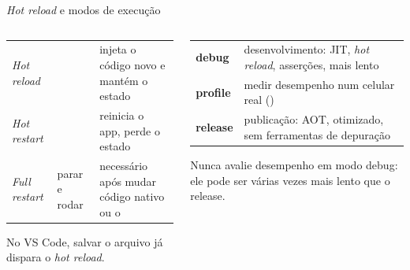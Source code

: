 \documentclass[aspectratio=169,10pt]{beamer}
\begin{document}
\begin{frame}{\emph{Hot reload} e modos de execução}
  \begin{columns}[T]
    \begin{column}{0.5\textwidth}
      \scriptsize
      \begin{tabularx}{\linewidth}{@{}l L L@{}}
        \toprule
         &  &  \\
        \midrule
        \emph{Hot reload} &  & injeta o código novo e mantém o estado \\
        \emph{Hot restart} &  & reinicia o app, perde o estado \\
        \emph{Full restart} & parar e rodar & necessário após mudar código nativo ou o  \\
        \bottomrule
      \end{tabularx}
      \begin{dica}
        No VS Code, salvar o arquivo já dispara o \emph{hot reload}.
      \end{dica}
    \end{column}
    \begin{column}{0.48\textwidth}
      \scriptsize
      \begin{tabularx}{\linewidth}{@{}l L@{}}
        \toprule
         &  \\
        \midrule
        \textbf{debug} & desenvolvimento: JIT, \emph{hot reload}, asserções, mais lento \\
        \textbf{profile} & medir desempenho num celular real () \\
        \textbf{release} & publicação: AOT, otimizado, sem ferramentas de depuração \\
        \bottomrule
      \end{tabularx}
      \begin{atencao}
        Nunca avalie desempenho em modo debug: ele pode ser várias vezes mais lento que o release.
      \end{atencao}
    \end{column}
  \end{columns}
\end{frame}
\end{document}
